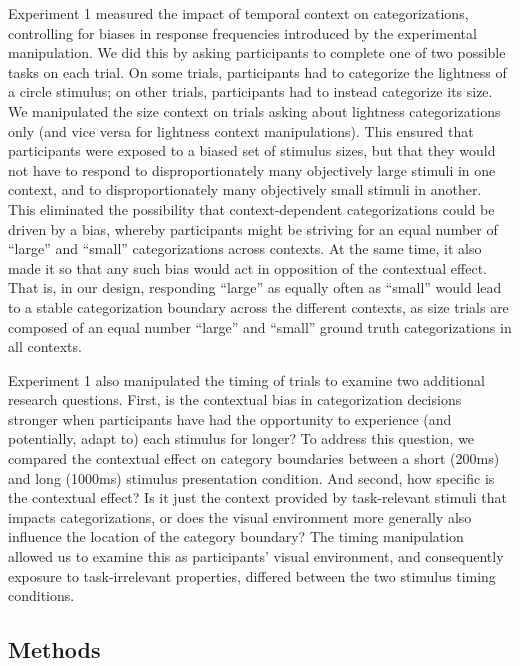 \documentclass[a4paper, nobind]{templates/ociamthesis}
\begin{document}
Experiment 1 measured the impact of temporal context on categorizations, controlling for biases in response frequencies introduced by the experimental manipulation. We did this by asking participants to complete one of two possible tasks on each trial. On some trials, participants had to categorize the lightness of a circle stimulus; on other trials, participants had to instead categorize its size. We manipulated the size context on trials asking about lightness categorizations only (and vice versa for lightness context manipulations). This ensured that participants were exposed to a biased set of stimulus sizes, but that they would not have to respond to disproportionately many objectively large stimuli in one context, and to disproportionately many objectively small stimuli in another. This eliminated the possibility that context-dependent categorizations could be driven by a bias, whereby participants might be striving for an equal number of ``large'' and ``small'' categorizations across contexts. At the same time, it also made it so that any such bias would act in opposition of the contextual effect. That is, in our design, responding ``large'' as equally often as ``small'' would lead to a stable categorization boundary across the different contexts, as size trials are composed of an equal number ``large'' and ``small'' ground truth categorizations in all contexts.

Experiment 1 also manipulated the timing of trials to examine two additional research questions. First, is the contextual bias in categorization decisions stronger when participants have had the opportunity to experience (and potentially, adapt to) each stimulus for longer? To address this question, we compared the contextual effect on category boundaries between a short (200ms) and long (1000ms) stimulus presentation condition. And second, how specific is the contextual effect? Is it just the context provided by task-relevant stimuli that impacts categorizations, or does the visual environment more generally also influence the location of the category boundary? The timing manipulation allowed us to examine this as participants' visual environment, and consequently exposure to task-irrelevant properties, differed between the two stimulus timing conditions.

\hypertarget{methods-6}{%
\subsection{Methods}\label{methods-6}}
\end{document}
